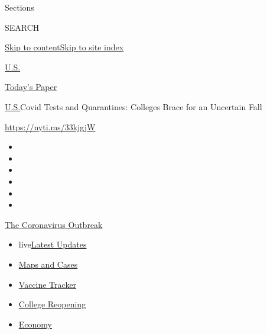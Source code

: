 Sections

SEARCH

\protect\hyperlink{site-content}{Skip to
content}\protect\hyperlink{site-index}{Skip to site index}

\href{https://www.nytimes3xbfgragh.onion/section/us}{U.S.}

\href{https://myaccount.nytimes3xbfgragh.onion/auth/login?response_type=cookie\&client_id=vi}{}

\href{https://www.nytimes3xbfgragh.onion/section/todayspaper}{Today's
Paper}

\href{/section/us}{U.S.}\textbar{}Covid Tests and Quarantines: Colleges
Brace for an Uncertain Fall

\url{https://nyti.ms/33kjgjW}

\begin{itemize}
\item
\item
\item
\item
\item
\item
\end{itemize}

\href{https://www.nytimes3xbfgragh.onion/news-event/coronavirus?action=click\&pgtype=Article\&state=default\&region=TOP_BANNER\&context=storylines_menu}{The
Coronavirus Outbreak}

\begin{itemize}
\tightlist
\item
  live\href{https://www.nytimes3xbfgragh.onion/2020/08/03/world/coronavirus-covid-19.html?action=click\&pgtype=Article\&state=default\&region=TOP_BANNER\&context=storylines_menu}{Latest
  Updates}
\item
  \href{https://www.nytimes3xbfgragh.onion/interactive/2020/us/coronavirus-us-cases.html?action=click\&pgtype=Article\&state=default\&region=TOP_BANNER\&context=storylines_menu}{Maps
  and Cases}
\item
  \href{https://www.nytimes3xbfgragh.onion/interactive/2020/science/coronavirus-vaccine-tracker.html?action=click\&pgtype=Article\&state=default\&region=TOP_BANNER\&context=storylines_menu}{Vaccine
  Tracker}
\item
  \href{https://www.nytimes3xbfgragh.onion/2020/08/02/us/covid-college-reopening.html?action=click\&pgtype=Article\&state=default\&region=TOP_BANNER\&context=storylines_menu}{College
  Reopening}
\item
  \href{https://www.nytimes3xbfgragh.onion/live/2020/08/03/business/stock-market-today-coronavirus?action=click\&pgtype=Article\&state=default\&region=TOP_BANNER\&context=storylines_menu}{Economy}
\end{itemize}

